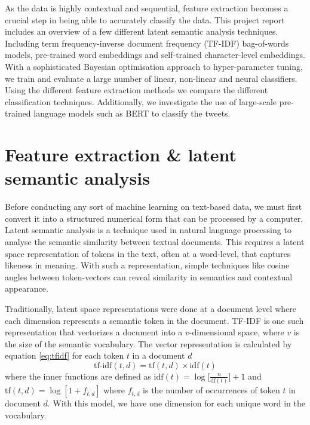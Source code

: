 \documentclass[journal, ]{IEEEtran}
\begin{document}
As the data is highly contextual and sequential, feature extraction becomes a crucial step in being able to accurately classify the data. This project report includes an overview of a few different latent semantic analysis techniques. Including term frequency-inverse document frequency (TF-IDF)\cite{salton1986} bag-of-words models, pre-trained word embeddings\cite{pennington2014} and self-trained character-level embeddings. With a sophisticated Bayesian optimisation approach to hyper-parameter tuning, we train and evaluate a large number of linear, non-linear and neural classifiers. Using the different feature extraction methods we compare the different classification techniques. Additionally, we investigate the use of large-scale pre-trained language models such as BERT\cite{devlin2018} to classify the tweets. 

\section{Feature extraction \& latent semantic analysis}
Before conducting any sort of machine learning on text-based data, we must first convert it into a structured numerical form that can be processed by a computer. 
Latent semantic analysis\cite{dumais2004} is a technique used in natural language processing to analyse the semantic similarity between textual documents. This requires a latent space representation of tokens in the text, often at a word-level, that captures likeness in meaning. With such a representation, simple techniques like cosine angles between token-vectors can reveal similarity in semantics and contextual appearance. 

Traditionally, latent space representations were done at a document level where each dimension represents a semantic token in the document. TF-IDF is one such representation that vectorizes a document into a $v$-dimensional space, where $v$ is the size of the semantic vocabulary. The vector representation is calculated by equation \ref{eq:tfidf} for each token $t$ in a document $d$
\begin{equation}\label{eq:tfidf}
\text{tf-idf}(t, d) = \text{tf}(t, d) \times \text{idf}(t)
\end{equation}
where the inner functions are defined as
$\text{idf}(t) = \log\big[\frac{n}{\text{df}(t)}\big]+1$ and  $\text{tf}(t, d) = \log[1 + f_{t,d}]$
where $f_{t,d}$ is the number of occurrences of token $t$ in document $d$.
With this model, we have one dimension for each unique word in the vocabulary.
\end{document}
